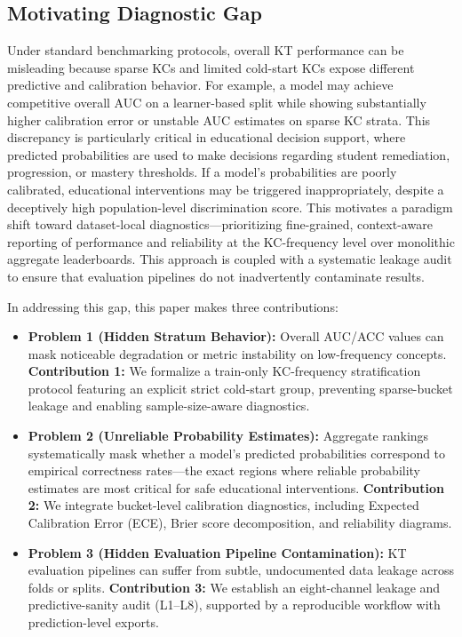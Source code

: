 \subsection{Motivating Diagnostic Gap}
Under standard benchmarking protocols, overall KT performance can be misleading because sparse KCs and limited cold-start KCs expose different predictive and calibration behavior. For example, a model may achieve competitive overall AUC on a learner-based split while showing substantially higher calibration error or unstable AUC estimates on sparse KC strata. This discrepancy is particularly critical in educational decision support, where predicted probabilities are used to make decisions regarding student remediation, progression, or mastery thresholds. If a model's probabilities are poorly calibrated, educational interventions may be triggered inappropriately, despite a deceptively high population-level discrimination score. This motivates a paradigm shift toward dataset-local diagnostics---prioritizing fine-grained, context-aware reporting of performance and reliability at the KC-frequency level over monolithic aggregate leaderboards. This approach is coupled with a systematic leakage audit to ensure that evaluation pipelines do not inadvertently contaminate results.

In addressing this gap, this paper makes three contributions:
\begin{itemize}
    \item \textbf{Problem 1 (Hidden Stratum Behavior):} Overall AUC/ACC values can mask noticeable degradation or metric instability on low-frequency concepts. 
    \textbf{Contribution 1:} We formalize a train-only KC-frequency stratification protocol featuring an explicit strict cold-start group, preventing sparse-bucket leakage and enabling sample-size-aware diagnostics.
    \item \textbf{Problem 2 (Unreliable Probability Estimates):} Aggregate rankings systematically mask whether a model's predicted probabilities correspond to empirical correctness rates---the exact regions where reliable probability estimates are most critical for safe educational interventions. 
    \textbf{Contribution 2:} We integrate bucket-level calibration diagnostics, including Expected Calibration Error (ECE), Brier score decomposition, and reliability diagrams.
    \item \textbf{Problem 3 (Hidden Evaluation Pipeline Contamination):} KT evaluation pipelines can suffer from subtle, undocumented data leakage across folds or splits. 
    \textbf{Contribution 3:} We establish an eight-channel leakage and predictive-sanity audit (L1--L8), supported by a reproducible workflow with prediction-level exports.
\end{itemize}

